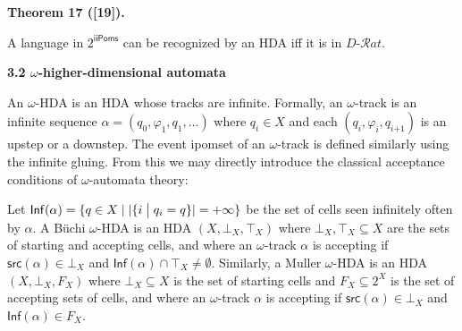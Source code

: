  
 
\par\medskip\noindent\textbf{Theorem 17 ([19]).}\par
 
 
A language in $2^{\mathsf{iiPoms}}$ can be recognized by an HDA iff it is in $D\text{-}\mathcal{R}at$.\par
 
 
 
 
 
\par\medskip\noindent\textbf{3.2 $\omega$-higher-dimensional automata}\par
 
 
An $\omega$-HDA is an HDA whose tracks are infinite. Formally, an $\omega$-track is an infinite sequence $\alpha=(q_{0},\varphi_{1},q_{1},\dots)$ where $q_{i}\in X$ and each $(q_{i},\varphi_{i},q_{i\text{+}1})$ is an upstep or a downstep. The event ipomset of an $\omega$-track is defined similarly using the infinite gluing. From this we may directly introduce the classical acceptance conditions of $\omega$-automata theory:\par
 
 
 
Let $\mathsf{Inf}(\alpha)={\{q\in X\mid|\{i\mathrel{\big{|}}q_{i}=q\}|=+\infty\}}$ be the set of cells seen infinitely often by $\alpha$. A Büchi $\omega$-HDA is an HDA $(X,\bot_{X},\top_{X})$ where $\bot_{X},\top_{X}\subseteq X$ are the sets of starting and accepting cells, and where an $\omega$-track $\alpha$ is accepting if $\mathsf{src}(\alpha)\in\bot_{X}$ and $\mathsf{Inf}(\alpha)\cap\top_{X}\neq\emptyset$. Similarly, a Muller $\omega$-HDA is an HDA $(X,\bot_{X},F_{X})$ where $\bot_{X}\subseteq X$ is the set of starting cells and $F_{X}\subseteq 2^{X}$ is the set of accepting sets of cells, and where an $\omega$-track $\alpha$ is accepting if $\mathsf{src}(\alpha)\in\bot_{X}$ and $\mathsf{Inf}(\alpha)\in F_{X}$.\par
 
 
 
